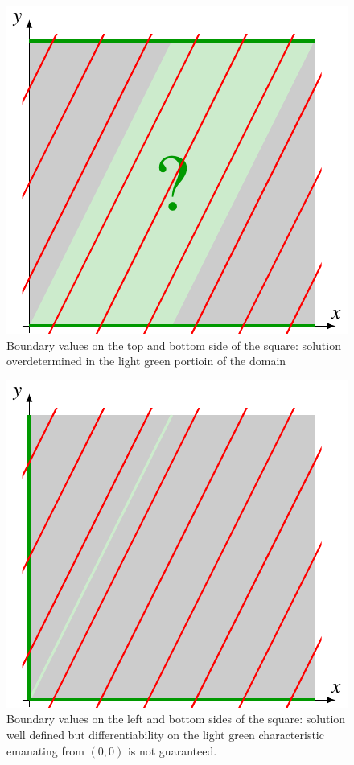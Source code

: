 \begin{figure}
\begin{center}
\includegraphics{3-geometry/images/overdetermined.pdf}
\end{center}
\caption{Boundary values on the top and bottom side of the square:
solution overdetermined in the light green portioin of the domain
\label{geometrie:charrand2}}
\end{figure}

\begin{figure}
\begin{center}
\includegraphics{3-geometry/images/nondifferentiable.pdf}
\end{center}
\caption{Boundary values on the left and bottom sides of the square:
solution well defined but differentiability on the light green
characteristic emanating from $(0,0)$ is not guaranteed.
\label{geometrie:charrand3}}
\end{figure}

